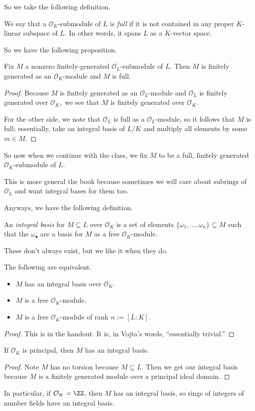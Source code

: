 So we take the following definition.
\begin{defi}[Full]
    We say that a $\mathcal O_K$-submodule of $L$ is \textit{full} if it is not contained in any proper $K$-linear subspace of $L.$ In other words, it spans $L$ as a $K$-vector space.
\end{defi}
So we have the following proposition.
\begin{prop}
    Fix $M$ a nonzero finitely-generated $\mathcal O_L$-submodule of $L.$ Then $M$ is finitely generated as an $\mathcal O_K$-module and $M$ is full.
\end{prop}
\begin{proof}
    Because $M$ is finitely generated as an $\mathcal O_L$-module and $\mathcal O_L$ is finitely generated over $\mathcal O_K,$ we see that $M$ is finitely generated over $\mathcal O_K.$
    
    For the other side, we note that $\mathcal O_L$ is full as a $\mathcal O_L$-module, so it follows that $M$ is full; essentially, take an integral basis of $L/K$ and multiply all elements by some $m\in M.$
\end{proof}
So now when we continue with the class, we fix $M$ to be a full, finitely generated $\mathcal O_K$-submodule of $L.$
\begin{remark}
    This is more general the book because sometimes we will care about subrings of $\mathcal O_L$ and want integral bases for them too.
\end{remark}
Anyways, we have the following definition.
\begin{defi}
    An \textit{integral basis} for $M\subseteq L$ over $\mathcal O_K$ is a set of elements $\{\omega_1,\ldots,\omega_n\}\subseteq M$ such that the $\omega_\bullet$ are a basis for $M$ as a free $\mathcal O_K$-module.
\end{defi}
These don't always exist, but we like it when they do.
\begin{prop}
    The following are equivalent.
    \begin{itemize}
        \item $M$ has an integral basis over $\mathcal O_K.$
        \item $M$ is a free $\mathcal O_K$-module.
        \item $M$ is a free $\mathcal O_K$-module of rank $n:=[L:K].$
    \end{itemize}
\end{prop}
\begin{proof}
    This is in the handout. It is, in Vojta's words, ``essentially trivial.''
\end{proof}
\begin{prop}
    If $\mathcal O_K$ is principal, then $M$ has an integral basis.
\end{prop}
\begin{proof}
    Note $M$ has no torsion because $M\subseteq L.$ Then we get our integral basis because $M$ is a finitely generated module over a principal ideal domain.
\end{proof}
In particular, if $\mathcal O_K=\ZZ,$ then $M$ has an integral basis, so rings of integers of number fields have an integral basis.